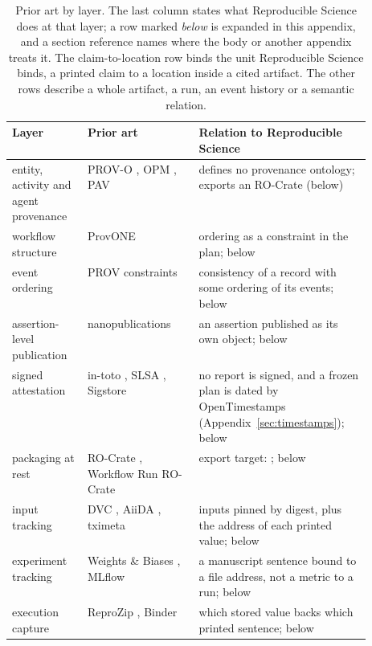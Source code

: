 \vspace{0.5\baselineskip}
\begin{table}[H]
\caption{Prior art by layer. The last column states what Reproducible Science does at that layer; a row
marked \emph{below} is expanded in this appendix, and a section reference names where the body or
another appendix treats it. The claim-to-location row binds the unit Reproducible Science binds, a printed
claim to a location inside a cited artifact. The other rows describe a whole artifact, a run, an
event history or a semantic relation.}
\label{tab:related-layers}
\footnotesize
\begin{tabularx}{\linewidth}{@{}>{\raggedright\arraybackslash}p{0.21\linewidth}>{\raggedright\arraybackslash}p{0.31\linewidth}L@{}}
\toprule
Layer & Prior art & Relation to Reproducible Science \\
\midrule
entity, activity and agent provenance & PROV-O \citep{lebo2013provo}, OPM \citep{moreau2011opm}, PAV \citep{ciccarese2013pav} & defines no provenance ontology; exports an RO-Crate (below) \\
workflow structure & ProvONE \citep{cuevasvicenttin2016provone,cao2016provone} & ordering as a constraint in the plan; below \\
event ordering & PROV constraints \citep{cheney2013provconstraints} & consistency of a record with some ordering of its events; below \\
assertion-level publication & nanopublications \citep{groth2013nanopubguidelines,kuhn2016nanopub} & an assertion published as its own object; below \\
signed attestation & in-toto \citep{torresarias2019intoto}, SLSA \citep{openssf2023slsa}, Sigstore \citep{newman2022sigstore} & no report is signed, and a frozen plan is dated by OpenTimestamps (Appendix~\ref{sec:timestamps}); below \\
packaging at rest & RO-Crate \citep{soilandreyes2022rocrate}, Workflow Run RO-Crate \citep{leone2024wrroc} & export target: ; below \\
input tracking & DVC \citep{iterative2020dvc}, AiiDA \citep{huber2020aiida}, tximeta \citep{love2020tximeta} & inputs pinned by digest, plus the address of each printed value; below \\
experiment tracking & Weights \& Biases \citep{wandb2026docs}, MLflow \citep{mlflow2026tracking} & a manuscript sentence bound to a file address, not a metric to a run; below \\
execution capture & ReproZip \citep{chirigati2016reprozip}, Binder \citep{jupyter2018binder} & which stored value backs which printed sentence; below \\

\end{tabularx}
\end{table}
